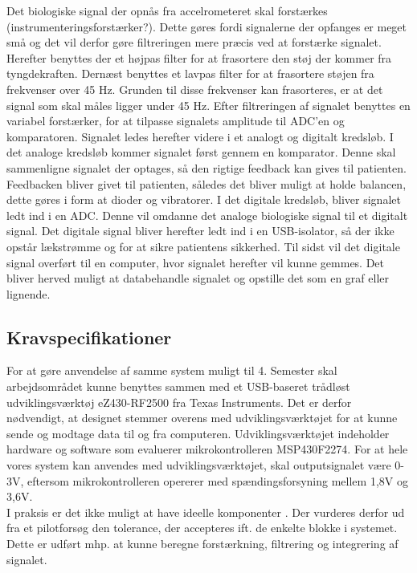 Det biologiske signal der opnås fra accelrometeret skal forstærkes (instrumenteringsforstærker?). Dette gøres fordi signalerne der opfanges er meget små og det vil derfor gøre filtreringen mere præcis ved at forstærke signalet.
Herefter benyttes der et højpas filter for at frasortere den støj der kommer fra tyngdekraften.  Dernæst benyttes et lavpas filter for at frasortere støjen fra frekvenser over 45 Hz. Grunden til disse frekvenser kan frasorteres, er at det signal som skal måles ligger under 45 Hz. Efter filtreringen af signalet benyttes en variabel forstærker, for at tilpasse signalets amplitude til ADC’en og komparatoren. Signalet ledes herefter videre i et analogt og digitalt kredsløb. I det analoge kredsløb kommer signalet først gennem en komparator. Denne skal sammenligne signalet der optages, så den rigtige feedback kan gives til patienten. Feedbacken bliver givet til patienten, således det bliver muligt at holde balancen, dette gøres i form at dioder og vibratorer. I det digitale kredsløb, bliver signalet ledt ind i en ADC. Denne vil omdanne det analoge biologiske signal til et digitalt signal. Det digitale signal bliver herefter ledt ind i en USB-isolator, så der ikke opstår lækstrømme og for at sikre patientens sikkerhed. Til sidst vil det digitale signal overført til en computer, hvor signalet herefter vil kunne gemmes. Det bliver herved muligt at databehandle signalet og opstille det som en graf eller lignende.

\subsection{Kravspecifikationer}
For at gøre anvendelse af samme system muligt til 4. Semester skal arbejdsområdet kunne benyttes sammen med et USB-baseret trådløst udviklingsværktøj eZ430-RF2500 fra Texas Instruments. Det er derfor nødvendigt, at designet stemmer overens med udviklingsværktøjet for at kunne sende og modtage data til og fra computeren. Udviklingsværktøjet indeholder hardware og software som evaluerer mikrokontrolleren MSP430F2274. For at hele vores system kan anvendes med udviklingsværktøjet, skal outputsignalet være 0-3V, eftersom mikrokontrolleren opererer med spændingsforsyning mellem 1,8V og 3,6V. \\
I praksis er det ikke muligt at have ideelle komponenter . Der vurderes derfor ud fra et pilotforsøg den tolerance, der accepteres ift. de enkelte blokke i systemet. Dette er udført mhp. at kunne beregne forstærkning, filtrering og integrering af signalet.

